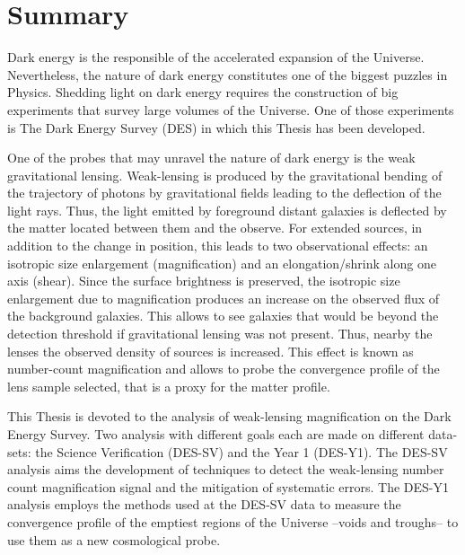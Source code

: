 \chapter*{Summary}
Dark energy is the responsible of the accelerated expansion of the Universe. Nevertheless, the nature of dark energy constitutes one of the biggest puzzles in Physics. Shedding light on dark energy requires the construction of big experiments that survey large volumes of the Universe. One of those experiments is The Dark Energy Survey (DES) in which this Thesis has been developed.
\newline

One of the probes that may unravel the nature of dark energy is the weak gravitational lensing. Weak-lensing is produced by the gravitational bending of the trajectory of photons by gravitational fields leading to the deflection of the light rays. Thus, the light emitted by foreground distant galaxies is deflected by the matter located between them and the observe. For extended sources, in addition to the change in position, this leads to two observational effects: an isotropic size enlargement (magnification) and an elongation/shrink along one axis (shear). Since the surface brightness is preserved, the isotropic size enlargement due to magnification produces an increase on the observed flux of the background galaxies. This allows to see galaxies that would be beyond the detection threshold if gravitational lensing was not present. Thus, nearby the lenses the observed density of sources is increased. This effect is known as number-count magnification and allows to probe the convergence profile of the lens sample selected, that is a proxy for the matter profile.
\newline

This Thesis is devoted to the analysis of weak-lensing magnification on the Dark Energy Survey. Two analysis with different goals each are made on different data-sets: the Science Verification (DES-SV) and the Year 1 (DES-Y1). The DES-SV analysis aims the development of techniques to detect the weak-lensing number count magnification signal and the mitigation of systematic errors. The DES-Y1 analysis employs the methods used at the DES-SV data to measure the convergence profile of the emptiest regions of the Universe --voids and troughs-- to use them as a new cosmological probe.